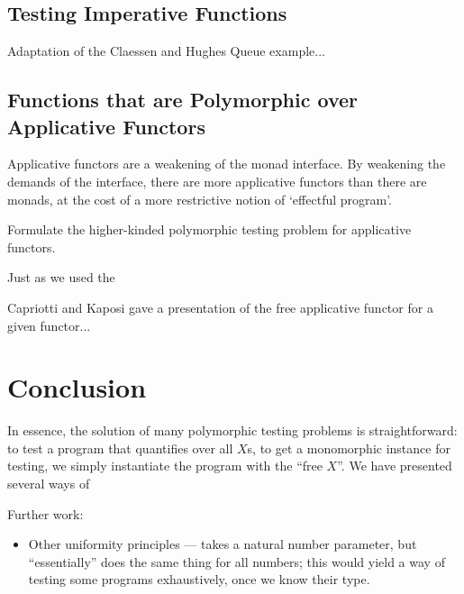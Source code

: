 \documentclass{llncs}
\begin{document}
\subsection{Testing Imperative Functions}

Adaptation of the Claessen and Hughes Queue example...

\subsection{Functions that are Polymorphic over Applicative Functors}

Applicative functors \cite{mcbride-patterson} are a weakening of the
monad interface. By weakening the demands of the interface, there are
more applicative functors than there are monads, at the cost of a more
restrictive notion of `effectful program'.

Formulate the higher-kinded polymorphic testing problem for
applicative functors.

Just as we used the 

Capriotti and Kaposi gave a presentation of the free applicative
functor for a given functor...

\section{Conclusion}

In essence, the solution of many polymorphic testing problems is
straightforward: to test a program that quantifies over all $X$s, to
get a monomorphic instance for testing, we simply instantiate the
program with the ``free $X$''. We have presented several ways of 

Further work:
\begin{itemize}
\item Other uniformity principles --- takes a natural number
  parameter, but ``essentially'' does the same thing for all numbers;
  this would yield a way of testing some programs exhaustively, once
  we know their type.
\end{itemize}

%  
\end{document}
